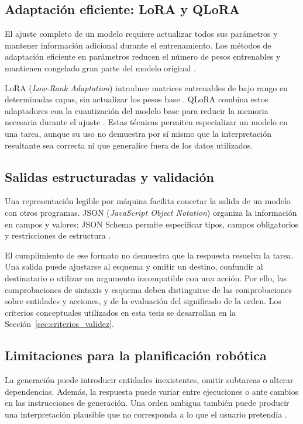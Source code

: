 \subsection{Adaptación eficiente: LoRA y QLoRA}

El ajuste completo de un modelo requiere actualizar todos sus parámetros y mantener información adicional durante el entrenamiento. Los métodos de adaptación eficiente en parámetros reducen el número de pesos entrenables y mantienen congelado gran parte del modelo original \cite{houlsby2019parameter}.

LoRA (\textit{Low-Rank Adaptation}) introduce matrices entrenables de bajo rango en determinadas capas, sin actualizar los pesos base \cite{hu2022lora}. QLoRA combina estos adaptadores con la cuantización del modelo base para reducir la memoria necesaria durante el ajuste \cite{dettmers2023qlora}. Estas técnicas permiten especializar un modelo en una tarea, aunque su uso no demuestra por sí mismo que la interpretación resultante sea correcta ni que generalice fuera de los datos utilizados.

\subsection{Salidas estructuradas y validación}
\label{subsec:salidas-validacion}

Una representación legible por máquina facilita conectar la salida de un modelo con otros programas. JSON (\textit{JavaScript Object Notation}) organiza la información en campos y valores; JSON Schema permite especificar tipos, campos obligatorios y restricciones de estructura \cite{jsonSchemaSpecification}.

El cumplimiento de ese formato no demuestra que la respuesta resuelva la tarea. Una salida puede ajustarse al esquema y omitir un destino, confundir al destinatario o utilizar un argumento incompatible con una acción. Por ello, las comprobaciones de sintaxis y esquema deben distinguirse de las comprobaciones sobre entidades y acciones, y de la evaluación del significado de la orden. Los criterios conceptuales utilizados en esta tesis se desarrollan en la Sección~\ref{sec:criterios_validez}.

\subsection{Limitaciones para la planificación robótica}

La generación puede introducir entidades inexistentes, omitir subtareas o alterar dependencias. Además, la respuesta puede variar entre ejecuciones o ante cambios en las instrucciones de generación. Una orden ambigua también puede producir una interpretación plausible que no corresponda a lo que el usuario pretendía \cite{Shi2023}.

